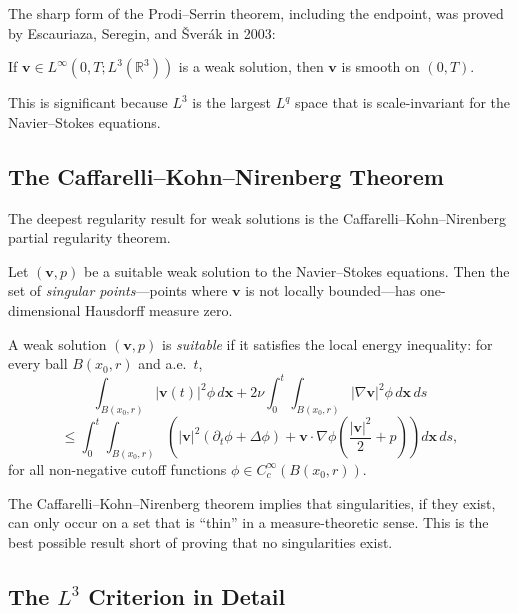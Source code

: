 The sharp form of the Prodi--Serrin theorem, including the endpoint, was proved by Escauriaza, Seregin, and \v{S}ver\'{a}k in 2003:

\begin{theorem}
\label{thm:ESS}
If $\mathbf{v} \in L^\infty(0, T; L^3(\mathbb{R}^3))$ is a weak solution, then $\mathbf{v}$ is smooth on $(0, T)$.
\end{theorem}

This is significant because $L^3$ is the largest $L^q$ space that is scale-invariant for the Navier--Stokes equations.

\subsection{The Caffarelli--Kohn--Nirenberg Theorem}

The deepest regularity result for weak solutions is the Caffarelli--Kohn--Nirenberg partial regularity theorem.

\begin{theorem}
\label{thm:CKN}
Let $(\mathbf{v}, p)$ be a suitable weak solution to the Navier--Stokes equations. Then the set of \textit{singular points}---points where $\mathbf{v}$ is not locally bounded---has one-dimensional Hausdorff measure zero.
\end{theorem}

\begin{definition}
A weak solution $(\mathbf{v}, p)$ is \textit{suitable} if it satisfies the local energy inequality: for every ball $B(x_0, r)$ and a.e.\ $t$,
\[
\int_{B(x_0, r)} |\mathbf{v}(t)|^2 \phi \, d\mathbf{x} + 2\nu \int_0^t \int_{B(x_0, r)} |\nabla \mathbf{v}|^2 \phi \, d\mathbf{x} \, ds
\]
\[
\le \int_0^t \int_{B(x_0, r)} \left( |\mathbf{v}|^2 (\partial_t \phi + \Delta \phi) + \mathbf{v} \cdot \nabla \phi \left( \frac{|\mathbf{v}|^2}{2} + p \right) \right) d\mathbf{x} \, ds,
\]
for all non-negative cutoff functions $\phi \in C_c^\infty(B(x_0, r))$.
\end{definition}

The Caffarelli--Kohn--Nirenberg theorem implies that singularities, if they exist, can only occur on a set that is ``thin'' in a measure-theoretic sense. This is the best possible result short of proving that no singularities exist.

\subsection{The $L^3$ Criterion in Detail}

